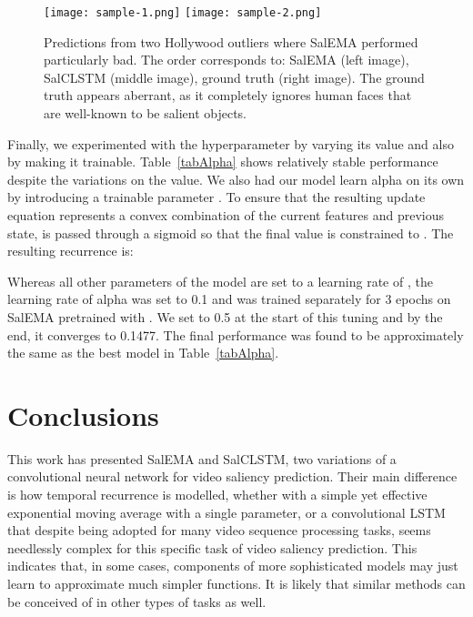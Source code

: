 \documentclass{bmvc2k}
\begin{document}
\begin{figure}[t]
\begin{center}
\texttt{[image: sample-1.png]}
\texttt{[image: sample-2.png]}
\end{center}
\caption{Predictions from two Hollywood outliers where SalEMA performed particularly bad. The order corresponds to: SalEMA (left image), SalCLSTM (middle image), ground truth (right image). The ground truth appears aberrant, as it completely ignores human faces that are well-known to be salient objects.} 
\label{figHollywoodQ}
\end{figure}


Finally, we experimented with the  hyperparameter by varying its value and also by making it trainable. Table~\ref{tabAlpha} shows relatively stable performance despite the variations on the value. We also had our model learn alpha on its own by introducing a trainable parameter . To ensure that the resulting update equation represents a convex combination of the current features and previous state,   is passed through a sigmoid so that the final value is constrained to . The resulting recurrence is:


Whereas all other parameters of the model are set to a learning rate of , the learning rate of alpha was set to 0.1 and was trained separately for 3 epochs on SalEMA pretrained with . We set  to 0.5 at the start of this tuning and by the end, it converges to 0.1477. The final performance was found to be approximately the same as the best model in Table~\ref{tabAlpha}.




\section{Conclusions}

This work has presented SalEMA and SalCLSTM, two variations of a convolutional neural network for video saliency prediction. 
Their main difference is how temporal recurrence is modelled, whether with a simple yet effective exponential moving average with a single parameter, or a convolutional LSTM that despite being adopted for many video sequence processing tasks, seems needlessly complex for this specific task of video saliency prediction. This indicates that, in some cases, components of more sophisticated models may just learn to approximate much simpler functions. It is likely that similar methods can be conceived of in other types of tasks as well.
\end{document}
